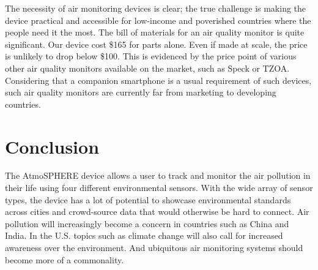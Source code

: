 \documentclass{sigchi}
\begin{document}
The necessity of air monitoring devices is clear; the true challenge is making the device practical and accessible for low-income and poverished countries where the people need it the most. 
The bill of materials for an air quality monitor is quite significant.
Our device cost \$165 for parts alone.
Even if made at scale, the price is unlikely to drop below \$100.
This is evidenced by the price point of various other air quality monitors available on the market, such as Speck\cite{Competitor:Speck} or TZOA\cite{Competitor:TZOA}.
Considering that a companion smartphone is a usual requirement of such devices, such air quality monitors are currently far from marketing to developing countries.

\section{Conclusion}
The AtmoSPHERE device allows a user to track and monitor the air pollution in their life using four different environmental sensors. 
With the wide array of sensor types, the device has a lot of potential to showcase environmental standards across cities and crowd-source data that would otherwise be hard to connect. 
Air pollution will increasingly become a concern in countries such as China and India.
In the U.S. topics such as climate change will also call for increased awareness over the environment.
And ubiquitous air monitoring systems should become more of a commonality.

\balance{}



\end{document}
